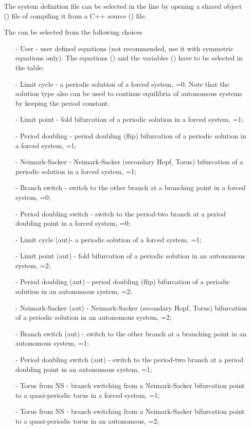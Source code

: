 \documentclass[10pt,a4paper]{ddedoc}
\begin{document}
The system definition file can be selected in the  line by
opening a shared object () file of compiling it from a C++ source
() file.

The  can be selected from the following choices
\begin{itemize}
\item[-] User - user defined equations (not recommended, use
it with symmetric equations only). The equations () and the
variables () have to be selected in the table;
\item[-] Limit cycle - a periodic solution of a forced system, =0. Note that the solution type also can be used to continue equilibria of autonomous systems by keeping the period constant.
\item[-] Limit point - fold bifurcation of a periodic solution in a forced
system, =1;
\item[-] Period doubling - period doubling (flip) bifurcation of a periodic
solution in a forced system, =1;
\item[-] Neimark-Sacker - Neimark-Sacker (secondary Hopf, Torus) bifurcation of
a periodic solution in a forced system, =1;
\item[-] Branch switch - switch to the other branch at a branching point in a
forced system, =0;
\item[-] Period doubling switch - switch to the period-two branch at a period
doubling point in a forced system, =0;
\item[-] Limit cycle (aut)- a periodic solution of a forced system,
=1;
\item[-] Limit point (aut) - fold bifurcation of a periodic solution in an
autonomous system, =2;
\item[-] Period doubling (aut) - period doubling (flip) bifurcation of a
periodic solution in an autonomous system, =2;
\item[-] Neimark-Sacker (aut) - Neimark-Sacker (secondary Hopf, Torus)
bifurcation of a periodic solution in an autonomous system, =2;
\item[-] Branch switch (aut) - switch to the other branch at a branching point
in an autonomous system, =1;
\item[-] Period doubling switch (aut) - switch to the period-two branch at a
period doubling point in an autonomous system, =1;
\item[-] Torus from NS - branch switching from a Neimark-Sacker bifurcation
point to a quasi-periodic torus in a forced system, =1;
\item[-] Torus from NS - branch switching from a Neimark-Sacker bifurcation
point to a quasi-periodic torus in an autonomous, =2;
\end{itemize}
\end{document}
